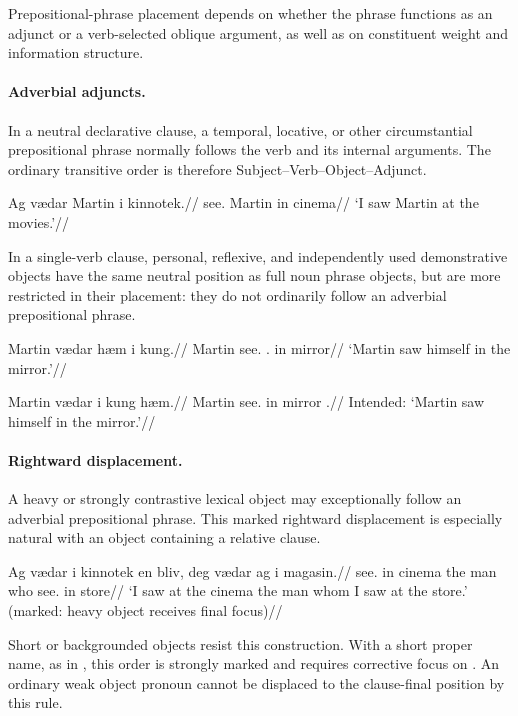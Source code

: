 Prepositional-phrase placement depends on whether the phrase functions as an adjunct or a verb-selected oblique argument, as well as on constituent weight and information structure.

\paragraph{Adverbial adjuncts.}

In a neutral declarative clause, a temporal, locative, or
other circumstantial prepositional phrase normally follows
the verb and its internal arguments. The ordinary transitive
order is therefore Subject--Verb--Object--Adjunct.

\pex
\begingl
\gla Ag vædar Martin i kinnotek.//
\glb \First{}\Sg{} see.\Pst{} Martin in cinema//
\glft `I saw Martin at the movies.'//
\endgl
\xe

In a single-verb clause, personal, reflexive, and independently used demon\-strative objects have the same neutral position as full noun phrase objects, but are more restricted in their placement: they do not ordinarily follow an adverbial prepositional phrase.

\pex
\begingl
\gla Martin vædar hæm i kung.//
\glb Martin see.\Pst{} \Refl{}.\Acc{} in mirror//
\glft `Martin saw himself in the mirror.'//
\endgl
\xe

\pex
\begingl
\gla *Martin vædar i kung hæm.//
\glb Martin see.\Pst{} in mirror \Refl{}.\Acc{}//
\glft Intended: `Martin saw himself in the mirror.'//
\endgl
\xe

\paragraph{Rightward displacement.}

A heavy or strongly contrastive lexical object may exceptionally follow an adverbial prepositional phrase. This marked rightward displacement is especially natural with an object containing a relative clause.

\pex
\begingl
\gla Ag vædar i kinnotek en bliv, deg vædar ag i magasin.//
\glb \First{}\Sg{} see.\Pst{} in cinema the man who
      see.\Pst{} \First{}\Sg{} in store//
\glft `I saw at the cinema the man whom I saw at the
store.' (marked: heavy object receives final focus)//
\endgl
\xe

Short or backgrounded objects resist this construction.
With a short proper name, as in , this order
is strongly marked and requires corrective focus on
. An ordinary weak object pronoun cannot be
displaced to the clause-final position by this rule.

